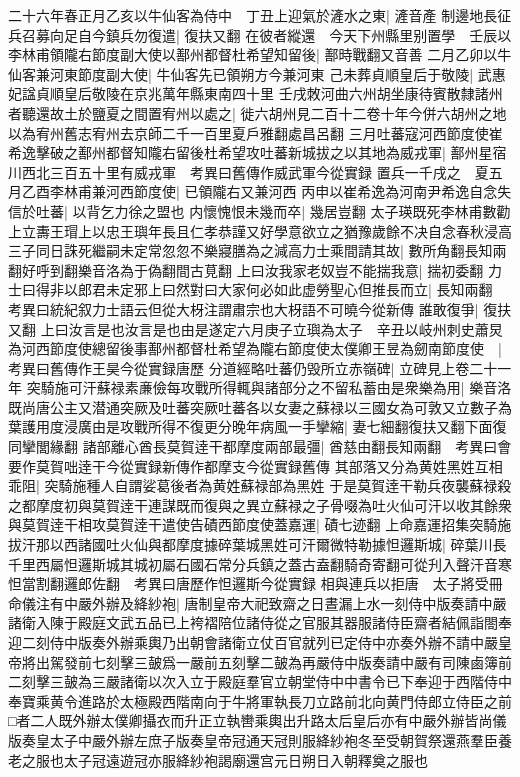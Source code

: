 二十六年春正月乙亥以牛仙客為侍中　丁丑上迎氣於滻水之東|{
	滻音產}
制邊地長征兵召募向足自今鎮兵勿復遣|{
	復扶又翻}
在彼者縱還　今天下州縣里别置學　壬辰以李林甫領隴右節度副大使以鄯州都督杜希望知留後|{
	鄯時戰翻又音善}
二月乙卯以牛仙客兼河東節度副大使|{
	牛仙客先已領朔方今兼河東}
己未葬貞順皇后于敬陵|{
	武惠妃諡貞順皇后敬陵在京兆萬年縣東南四十里}
壬戌敇河曲六州胡坐康待賓散隸諸州者聽還故土於鹽夏之間置宥州以處之|{
	徙六胡州見二百十二卷十年今併六胡州之地以為宥州舊志宥州去京師二千一百里夏戶雅翻處昌呂翻}
三月吐蕃寇河西節度使崔希逸擊破之鄯州都督知隴右留後杜希望攻吐蕃新城拔之以其地為威戎軍|{
	鄯州星宿川西北三百五十里有威戎軍　考異曰舊傳作威武軍今從實録}
置兵一千戌之　夏五月乙酉李林甫兼河西節度使|{
	已領隴右又兼河西}
丙申以崔希逸為河南尹希逸自念失信於吐蕃|{
	以背乞力徐之盟也}
内懷愧恨未幾而卒|{
	幾居豈翻}
太子瑛既死李林甫數勸上立夀王瑁上以忠王璵年長且仁孝恭謹又好學意欲立之猶豫歲餘不决自念春秋浸高三子同日誅死繼嗣未定常忽忽不樂寢膳為之減高力士乘間請其故|{
	數所角翻長知兩翻好呼到翻樂音洛為于偽翻間古莧翻}
上曰汝我家老奴豈不能揣我意|{
	揣初委翻}
力士曰得非以郎君未定邪上曰然對曰大家何必如此虚勞聖心但推長而立|{
	長知兩翻　考異曰統紀叙力士語云但從大枒注謂肅宗也大枒語不可曉今從新傳}
誰敢復爭|{
	復扶又翻}
上曰汝言是也汝言是也由是遂定六月庚子立璵為太子　辛丑以岐州刺史蕭炅為河西節度使總留後事鄯州都督杜希望為隴右節度使太僕卿王昱為劒南節度使　|{
	考異曰舊傳作王昊今從實録唐歷}
分道經略吐蕃仍毁所立赤嶺碑|{
	立碑見上卷二十一年}
突騎施可汗蘇禄素亷儉每攻戰所得輒與諸部分之不留私蓄由是衆樂為用|{
	樂音洛}
既尚唐公主又潜通突厥及吐蕃突厥吐蕃各以女妻之蘇禄以三國女為可敦又立數子為葉護用度浸廣由是攻戰所得不復更分晚年病風一手攣縮|{
	妻七細翻復扶又翻下面復同攣閭緣翻}
諸部離心酋長莫賀逹干都摩度兩部最彊|{
	酋慈由翻長知兩翻　考異曰會要作莫賀咄逹干今從實録新傳作都摩支今從實録舊傳}
其部落又分為黄姓黑姓互相乖阻|{
	突騎施種人自謂娑葛後者為黄姓蘇禄部為黑姓}
于是莫賀逹干勒兵夜襲蘇禄殺之都摩度初與莫賀逹干連謀既而復與之異立蘇禄之子骨啜為吐火仙可汗以收其餘衆與莫賀逹干相攻莫賀逹干遣使告磧西節度使蓋嘉運|{
	磧七迹翻}
上命嘉運招集突騎施拔汗那以西諸國吐火仙與都摩度據碎葉城黑姓可汗爾微特勒據怛邏斯城|{
	碎葉川長千里西屬怛邏斯城其城初屬石國石常分兵鎮之蓋古盍翻騎奇寄翻可從刋入聲汗音寒怛當割翻邏郎佐翻　考異曰唐歷作怛邏斯今從實録}
相與連兵以拒唐　太子將受冊命儀注有中嚴外辦及絳紗袍|{
	唐制皇帝大祀致齋之日晝漏上水一刻侍中版奏請中嚴諸衛入陳于殿庭文武五品已上袴褶陪位諸侍從之官服其器服諸侍臣齋者結佩詣閤奉迎二刻侍中版奏外辦乘輿乃出朝會諸衛立仗百官就列已定侍中亦奏外辦不請中嚴皇帝將出駕發前七刻擊三皷爲一嚴前五刻擊二皷為再嚴侍中版奏請中嚴有司陳鹵簿前二刻擊三皷為三嚴諸衛以次入立于殿庭羣官立朝堂侍中中書令已下奉迎于西階侍中奉寶乘黄令進路於太極殿西階南向于牛將軍執長刀立路前北向黄門侍郎立侍臣之前□者二人既外辦太僕卿攝衣而升正立執轡乘輿出升路太后皇后亦有中嚴外辦皆尚儀版奏皇太子中嚴外辦左庶子版奏皇帝冠通天冠則服絳紗袍冬至受朝賀祭還燕羣臣養老之服也太子冠遠遊冠亦服絳紗袍謁廟還宫元日朔日入朝釋奠之服也}
